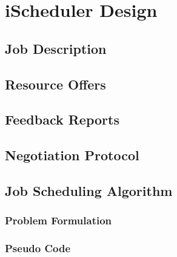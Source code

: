 \chapter{iScheduler Design}\label{chapter:ischeduler}
\section{Job Description}
\section{Resource Offers}
\section{Feedback Reports}
\section{Negotiation Protocol}
\section{Job Scheduling Algorithm}
\subsection{Problem Formulation}
\subsection{Pseudo Code}
